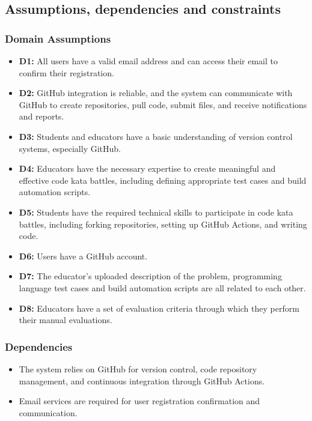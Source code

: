 \documentclass{article}
\begin{document}
\newpage
\subsection{Assumptions, dependencies and constraints}

\subsubsection{Domain Assumptions}

\begin{itemize}
    \item \textbf{D1:} All users have a valid email address and can access their email to confirm their registration.
    \item \textbf{D2:} GitHub integration is reliable, and the system can communicate with GitHub to create repositories, pull code, submit files, and receive notifications and reports.
    \item \textbf{D3:} Students and educators have a basic understanding of version control systems, especially GitHub.
    \item \textbf{D4:} Educators have the necessary expertise to create meaningful and effective code kata battles, including defining appropriate test cases and build automation scripts.
    \item \textbf{D5:} Students have the required technical skills to participate in code kata battles, including forking repositories, setting up GitHub Actions, and writing code.
    \item \textbf{D6:} Users have a GitHub account.
    \item \textbf{D7:} The educator's uploaded description of the problem, programming language test cases and build automation scripts are all related to each other.
    \item \textbf{D8:} Educators have a set of evaluation criteria through which they perform their manual evaluations.
\end{itemize}

\subsubsection{Dependencies}

\begin{itemize}
    \item The system relies on GitHub for version control, code repository management, and continuous integration through GitHub Actions.
    \item Email services are required for user registration confirmation and communication.
\end{itemize}
\end{document}
